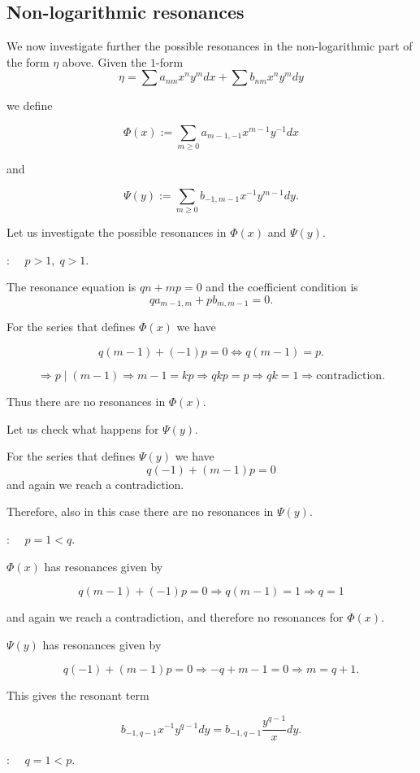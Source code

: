 \documentclass[11pt,a4paper]{amsart}
\theoremstyle{definition}
\begin{document}
\subsection{Non-logarithmic resonances}
We now investigate further the possible resonances in the non-logarithmic part of the 
form $\eta$ above. Given the $1$-form
\[
\eta=\sum a_{nm}x^n y^m dx + \sum b_{nm}x^n y^m dy
\]

we define

\[
\Phi(x):=\sum_{m\ge 0} a_{m-1,-1} x^{m-1}y^{-1} dx
\]

and

\[
\Psi(y):=\sum_{m\ge 0} b_{-1,m-1} x^{-1}y^{m-1} dy.
\]

Let us investigate the possible resonances in $\Phi(x)$ and $\Psi(y)$.


 : $\quad p>1,\; q>1.$

The resonance equation is $qn+mp=0$ and the coefficient condition is
\[
q a_{m-1,m} + p b_{m,m-1} = 0.
\]

For the series that defines $\Phi(x)$ we have

\[
q(m-1)+(-1)p=0
\iff
q(m-1)=p.
\]

\[
\Rightarrow p\mid(m-1)
\Rightarrow m-1=kp
\Rightarrow qkp=p
\Rightarrow qk=1
\Rightarrow \text{contradiction}.
\]

Thus there are no resonances in $\Phi(x)$.

Let us check what happens for $\Psi(y)$.

For the series that defines $\Psi(y)$ we have
\[
q(-1)+(m-1)p=0
\]
and again we reach a contradiction.

Therefore, also in this case there are no resonances in $\Psi(y)$.


 : $\quad p=1<q.$

$\Phi(x)$ has resonances given by

\[
q(m-1)+(-1)p=0
\Rightarrow q(m-1)=1
\Rightarrow q=1
\]

and again we reach a contradiction,
and therefore no resonances for $\Phi(x)$.

$\Psi(y)$ has resonances given by

\[
q(-1)+(m-1)p=0
\Rightarrow -q+m-1=0
\Rightarrow m=q+1.
\]

This gives the resonant term

\[
b_{-1,q-1} x^{-1}y^{q-1}dy
=
b_{-1,q-1}\frac{y^{q-1}}{x}dy.
\]


 : $\quad q=1<p.$
\end{document}
